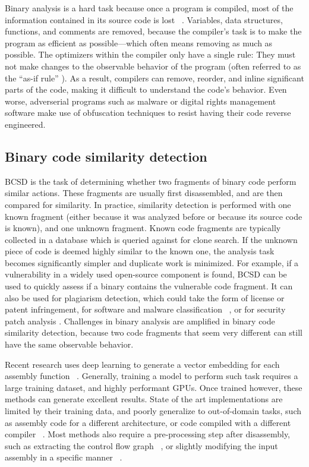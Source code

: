Binary analysis is a hard task because once a program is compiled, most of the information contained in its source code
is lost ~\cite{BCSDsurvey}. Variables, data structures, functions, and comments are removed, because the compiler's task is to make
the program as efficient as possible---which often means removing as much as possible. The optimizers within the compiler
only have a single rule: They must not make changes to the observable behavior of the program (often referred
to as the ``as-if rule'' \cite{c++11}). As a result, compilers can remove, reorder, and inline significant parts of the code, making
it difficult to understand the code's behavior. Even worse, adverserial programs such as malware or digital rights management software
make use of obfuscation techniques to resist having their code reverse engineered.

\subsection{Binary code similarity detection}

BCSD is the task of determining whether two fragments of binary code perform similar actions.
These fragments are usually first disassembled, and are then compared for similarity. In practice,
similarity detection is performed with one known fragment (either because it was analyzed before
or because its source code is known), and one unknown fragment. Known code fragments are typically collected in a
database which is queried against for clone search. If the unknown piece of code is deemed
highly similar to the known one, the analysis task becomes significantly simpler and duplicate work is minimized. For example,
if a vulnerability in a widely used open-source component is found, BCSD can be used to quickly
assess if a binary contains the vulnerable code fragment. It can also be used for plagiarism detection, which
could take the form of license or patent infringement, for software and malware classification ~\cite{op-seq}, or for 
security patch analysis \cite{patch}. Challenges in binary analysis are amplified in binary code similarity detection,
because two code fragments that seem very different can still have the same observable behavior.

Recent research uses deep learning to generate a vector embedding for each assembly function ~\cite{SAFE,PalmTree,OrderMatters,Asm2Vec,CLAP}.
Generally, training a model to perform such task requires a large training dataset, and highly performant GPUs.
Once trained however, these methods can generate excellent results.
State of the art implementations are limited by their training data, and poorly generalize to out-of-domain tasks,
such as assembly code for a different architecture, or code compiled with a different compiler ~\cite{BCSDsurvey,CLAP}.
Most methods also require a pre-processing step after disassembly, such as extracting the control flow graph
~\cite{OrderMatters,Asm2Vec}, or slightly modifying the input assembly in a specific manner ~\cite{PalmTree,CLAP}.

